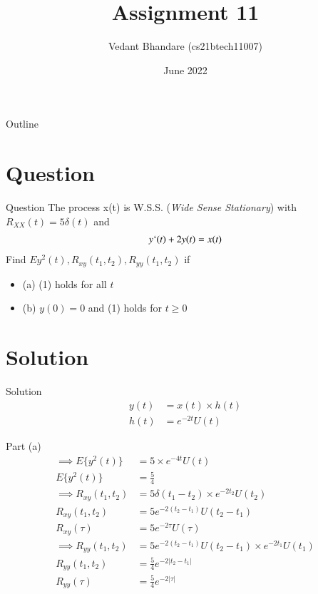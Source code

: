 \documentclass{beamer}
\title{Assignment 11}
\author{Vedant Bhandare (cs21btech11007)}
\date{June 2022}
\begin{document}
\begin{frame}
    \titlepage 
\end{frame}

\logo{}


\begin{frame}{Outline}
    \tableofcontents
\end{frame}

\section{Question}
\begin{frame}{Question}
    The process x(t) is W.S.S. (\textit{Wide Sense Stationary}) with $R_{XX}(t) = 5 \delta (t)$ and 
    \begin{align}
        y`(t) + 2y(t) = x(t)
    \end{align}
    Find $E{y^2(t)}, R_{xy}(t_1,t_2), R_{yy}(t_1,t_2)$ if\\
    \begin{itemize}
        \item (a) (1) holds for all $t$
        \item (b) $y(0) = 0$ and (1) holds for $t \geq 0$
    \end{itemize}
\end{frame}

\section{Solution}
\begin{frame}{Solution}
    \begin{align}
        y(t) &= x(t) \times h(t)\\
        h(t) &= e^{-2t}U(t)
    \end{align}
\end{frame}

\begin{frame}{Part (a)}
    \begin{align}
        \implies E\{y^2(t)\} &= 5\times e^{-4t} U(t)\\
        E\{y^2(t)\} &= \frac{5}{4}\\
        \implies R_{xy}(t_1,t_2) &= 5\delta(t_1 - t_2)\times e^{-2t_2} U(t_2)\\
        R_{xy}(t_1,t_2) &= 5e^{-2(t_2 - t_1)} U(t_2 - t_1)\\
        R_{xy}(\tau) &= 5e^{-2\tau}U(\tau)\\
        \implies R_{yy}(t_1,t_2) &= 5e^{-2(t_2 - t_1)} U(t_2 - t_1) \times e^{-2t_1}U(t_1)\\
        R_{yy}(t_1,t_2) &= \frac{5}{4}e^{-2|t_2 - t_1|}\\
        R_{yy}(\tau) &= \frac{5}{4}e^{-2|\tau|}
    \end{align}
\end{frame}
\end{document}
